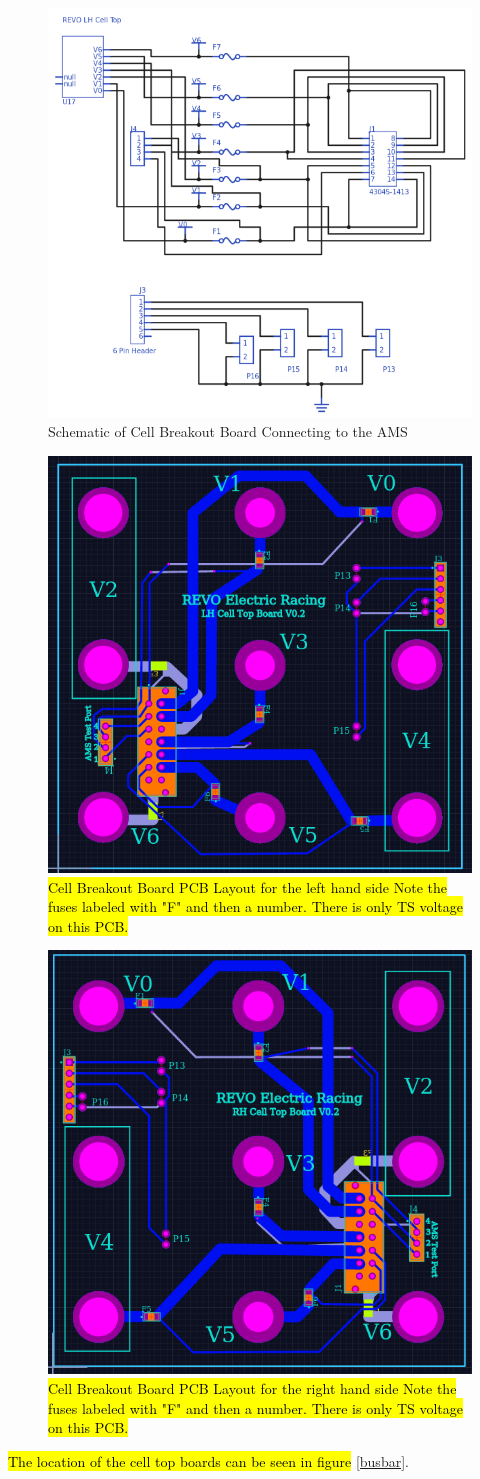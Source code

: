 \documentclass{article}
\DeclareRobustCommand{\hlr}[1]{{\sethlcolor{red}\hl{#1}}}
\begin{document}
            \begin{figure}[H]
                \centering
                \includegraphics[width = 0.4 \textwidth]{CellTopSchem}
                \caption{Schematic of Cell Breakout Board Connecting to the AMS}
                \label{celltopschem}
            \end{figure}


            \begin{figure}[H]
                \centering
                \includegraphics[width = 0.4 \textwidth]{CellTopLH}
                \caption{\hlr{Cell Breakout Board PCB Layout for the left hand side Note the fuses labeled with "F" and then a number. There is only TS voltage on this PCB.}} %
                \label{celltopLH}
            \end{figure}

            \begin{figure}[H]
                \centering
                \includegraphics[width = 0.4 \textwidth]{CellTopRH}
                \caption{\hlr{Cell Breakout Board PCB Layout for the right hand side Note the fuses labeled with "F" and then a number. There is only TS voltage on this PCB.}}
                \label{celltopRH}
            \end{figure}
            \hlr{The location of the cell top boards can be seen in figure} \ref{busbar}.
\end{document}
